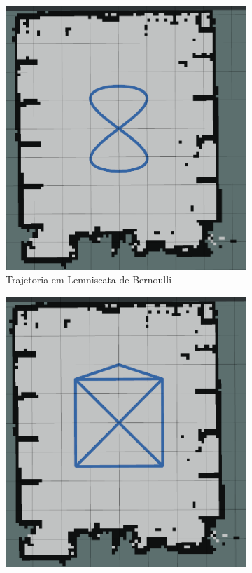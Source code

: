 \begin{figure}
    \centering
    \caption{Trajetórias Desejadas dos Experimentos}
    \begin{subfigure}[b]{0.4\textwidth}
        \includegraphics[width=\textwidth]{img/Trajetoria_Lemniscata.png}
        \caption{Trajetoria em Lemniscata de Bernoulli}
    \end{subfigure}
    \begin{subfigure}[b]{0.4\textwidth}
        \includegraphics[width=\textwidth]{img/Trajetoria_Casa.png}

\end{subfigure}
\end{figure}
